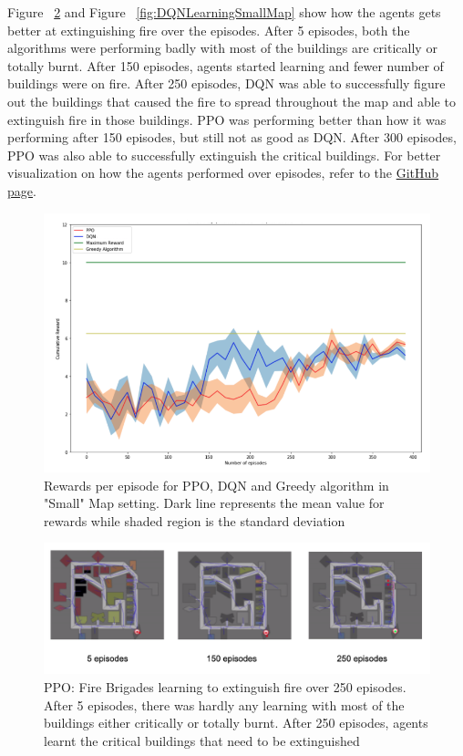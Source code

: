 \documentclass[12pt]{report}
\begin{document}
Figure ~\ref{fig:PPOLearningSmallMap} and Figure ~\ref{fig:DQNLearningSmallMap} show how the agents gets better at extinguishing fire over the episodes. After 5 episodes, both the algorithms were performing badly with most of the buildings are critically or totally burnt. After 150 episodes, agents started learning and fewer number of buildings were on fire. After 250 episodes, DQN was able to successfully figure out the buildings that caused the fire to spread throughout the map and able to extinguish fire in those buildings. PPO was performing better than how it was performing after 150 episodes, but still not as good as DQN. After 300 episodes, PPO was also able to successfully extinguish the critical buildings. For better visualization on how the agents performed over episodes, refer to the \href{https://github.com/animeshgoyal9/RoboCup_Rescue_Simulator_Gym_Integration} {GitHub page}. 

\begin{figure}[!h]
    \centering
    \includegraphics[width=12cm]{29.png}
    \caption{Rewards per episode for PPO, DQN and Greedy algorithm in "Small" Map setting. Dark line represents the mean value for rewards while shaded region is the standard deviation}
    \label{fig:SmallMapResults}
\end{figure}

\begin{figure}[!h]
    \centering
    \includegraphics[width=17cm]{PPO.png}
    \caption{PPO: Fire Brigades learning to extinguish fire over 250 episodes. After 5 episodes, there was hardly any learning with most of the buildings either critically or totally burnt. After 250 episodes, agents learnt the critical buildings that need to be extinguished}
    \label{fig:PPOLearningSmallMap}
\end{figure}
\end{document}

